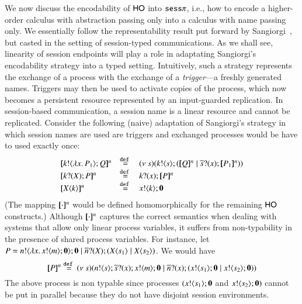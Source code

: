 We now discuss the encodability of  $\mathsf{HO}$ into $\mathtt{sess}\pi$, 
i.e., how to encode a higher-order calculus with abstraction passing only
into a calculus with name passing only. 
We essentially follow the representability result put forward by 
Sangiorgi~\cite{San92,SaWabook}, but casted in the setting of session-typed communications. 
As we shall see, linearity of session endpoints will play a role in adaptating Sangiorgi's 
encodability strategy into a typed setting. 
Intuitively, such a strategy represents the exchange of a process with the exchange of 
a \emph{trigger}---a freshly generated names. 
Triggers may then be used to activate copies of the process, which now becomes a persistent 
resource represented by an input-guarded replication. In session-based communication, a session name 
is a linear resource and cannot be replicated. Consider the following (naive) adaptation of 
Sangiorgi's strategy in which session names are used are triggers and exchanged processes would be have to used exactly once:
\[
	\begin{array}{lcl}
		\pmap{\bout{k}{\abs{x}{P_1}} Q}{n} & \defeq &  \newsp{s}{\bout{k}{s} (\pmap{Q}{n} \Par \binp{\dual{s}}{x} \pmap{P_1}{n})} \\
		\pmap{\binp{k}{X} P}{n} & \defeq& \binp{k}{x} \pmap{P}{n}\\
		\pmap{\appl{X}{k}}{n} & \defeq & \bout{x}{k} \inact
	\end{array}
	\]
%
%
(The mapping $[\!\![\cdot]\!\!]^n$ would be defined homomorphically for the remaining $\mathsf{HO}$ constructs.)
Although $[\!\![\cdot]\!\!]^n$ captures the correct semantics when
dealing with systems that allow only linear process variables,
it suffers from non-typability in the presence
of shared process variables. For instance,
let $P = n ! \langle \lambda x.\,x ! \langle m \rangle ;\mathbf{0} \rangle ; \mathbf{0} \;|\; \overline{n} ? (X) ; (X\langle s_1 \rangle \;|\; X\langle s_2 \rangle)$.
We would have
\[
	[\!\![P]\!\!]^n \stackrel{\mathtt{def}\ }{=}
	(\nu\ s)(n ! \langle s \rangle ; \overline{s} ? (x) ; x ! \langle m \rangle ; \mathbf{0} \;|\; \overline{n} ? (x) ; (x ! \langle s_1 \rangle ; \mathbf{0} \;|\; x ! \langle s_2 \rangle ; \mathbf{0}))
\]
The above process is non typable since processes $(x ! \langle s_1 \rangle ; \mathbf{0}$ and $x ! \langle s_2 \rangle ; \mathbf{0})$
cannot be put in parallel because they do not have disjoint session environments.

